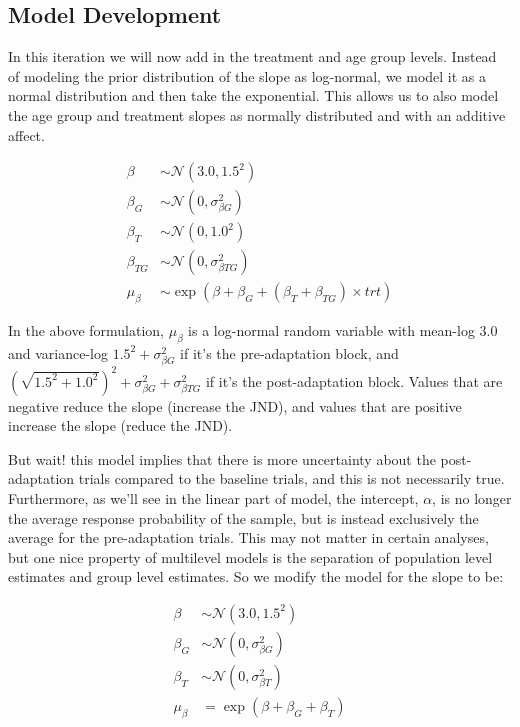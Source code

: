 \documentclass[11pt, oneside, openany]{scrbook}
\begin{document}
\hypertarget{iter2-model-dev}{%
\subsection{Model Development}\label{iter2-model-dev}}

In this iteration we will now add in the treatment and age group levels. Instead of modeling the prior distribution of the slope as log-normal, we model it as a normal distribution and then take the exponential. This allows us to also model the age group and treatment slopes as normally distributed and with an additive affect.

\begin{align*}
\beta &\sim \mathcal{N}(3.0, 1.5^2) \\
\beta_G &\sim \mathcal{N}(0, \sigma_{\beta G}^2) \\
\beta_T &\sim \mathcal{N}(0, 1.0^2) \\
\beta_{TG} &\sim \mathcal{N}(0, \sigma_{\beta TG}^2) \\
\mu_\beta &\sim \exp(\beta + \beta_G + (\beta_T + \beta_{TG})\times trt)
\end{align*}

In the above formulation, \(\mu_\beta\) is a log-normal random variable with mean-log \(3.0\) and variance-log \(1.5^2 + \sigma_{\beta G}^2\) if it's the pre-adaptation block, and \(\left(\sqrt{1.5^2 + 1.0^2}\right)^2 + \sigma_{\beta G}^2 + \sigma_{\beta TG}^2\) if it's the post-adaptation block. Values that are negative reduce the slope (increase the JND), and values that are positive increase the slope (reduce the JND).

But wait! this model implies that there is more uncertainty about the post-adaptation trials compared to the baseline trials, and this is not necessarily true. Furthermore, as we'll see in the linear part of model, the intercept, \(\alpha\), is no longer the average response probability of the sample, but is instead exclusively the average for the pre-adaptation trials. This may not matter in certain analyses, but one nice property of multilevel models is the separation of population level estimates and group level estimates. So we modify the model for the slope to be:

\begin{align*}
\beta &\sim \mathcal{N}(3.0, 1.5^2) \\
\beta_G &\sim \mathcal{N}(0, \sigma_{\beta G}^2) \\
\beta_T &\sim \mathcal{N}(0, \sigma_{\beta T}^2) \\
\mu_\beta &= \exp(\beta + \beta_G + \beta_T)
\end{align*}
\end{document}
